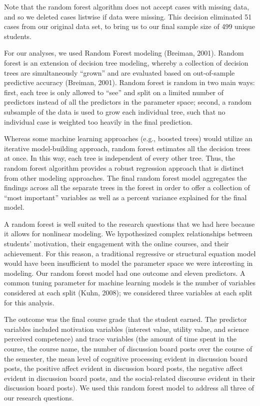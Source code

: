 \documentclass[]{book}
\begin{document}
Note that the random forest algorithm does not accept cases with missing
data, and so we deleted cases listwise if data were missing. This
decision eliminated 51 cases from our original data set, to bring us to
our final sample size of 499 unique students.

For our analyses, we used Random Forest modeling (Breiman, 2001). Random
forest is an extension of decision tree modeling, whereby a collection
of decision trees are simultaneously ``grown'' and are evaluated based
on out-of-sample predictive accuracy (Breiman, 2001). Random forest is
random in two main ways: first, each tree is only allowed to ``see'' and
split on a limited number of predictors instead of all the predictors in
the parameter space; second, a random subsample of the data is used to
grow each individual tree, such that no individual case is weighted too
heavily in the final prediction.

Whereas some machine learning approaches (e.g., boosted trees) would
utilize an iterative model-building approach, random forest estimates
all the decision trees at once. In this way, each tree is independent of
every other tree. Thus, the random forest algorithm provides a robust
regression approach that is distinct from other modeling approaches. The
final random forest model aggregates the findings across all the
separate trees in the forest in order to offer a collection of ``most
important'' variables as well as a percent variance explained for the
final model.

A random forest is well suited to the research questions that we had
here because it allows for nonlinear modeling. We hypothesized complex
relationships between students' motivation, their engagement with the
online courses, and their achievement. For this reason, a traditional
regressive or structural equation model would have been insufficient to
model the parameter space we were interesting in modeling. Our random
forest model had one outcome and eleven predictors. A common tuning
parameter for machine learning models is the number of variables
considered at each split (Kuhn, 2008); we considered three variables at
each split for this analysis.

The outcome was the final course grade that the student earned. The
predictor variables included motivation variables (interest value,
utility value, and science perceived competence) and trace variables
(the amount of time spent in the course, the course name, the number of
discussion board posts over the course of the semester, the mean level
of cognitive processing evident in discussion board posts, the positive
affect evident in discussion board posts, the negative affect evident in
discussion board posts, and the social-related discourse evident in
their discussion board posts). We used this random forest model to
address all three of our research questions.
\end{document}
